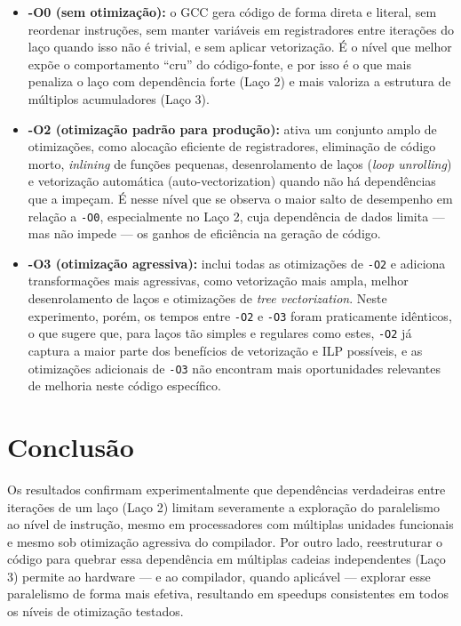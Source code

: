 \documentclass[a4paper,12pt]{article}
\begin{document}
\begin{itemize}
    \item \textbf{-O0 (sem otimização):} o GCC gera código de forma direta e literal, sem reordenar instruções, sem manter variáveis em registradores entre iterações do laço quando isso não é trivial, e sem aplicar vetorização. É o nível que melhor expõe o comportamento ``cru'' do código-fonte, e por isso é o que mais penaliza o laço com dependência forte (Laço 2) e mais valoriza a estrutura de múltiplos acumuladores (Laço 3).
    \item \textbf{-O2 (otimização padrão para produção):} ativa um conjunto amplo de otimizações, como alocação eficiente de registradores, eliminação de código morto, \textit{inlining} de funções pequenas, desenrolamento de laços (\textit{loop unrolling}) e vetorização automática (auto-vectorization) quando não há dependências que a impeçam. É nesse nível que se observa o maior salto de desempenho em relação a \texttt{-O0}, especialmente no Laço 2, cuja dependência de dados limita — mas não impede — os ganhos de eficiência na geração de código.
    \item \textbf{-O3 (otimização agressiva):} inclui todas as otimizações de \texttt{-O2} e adiciona transformações mais agressivas, como vetorização mais ampla, melhor desenrolamento de laços e otimizações de \textit{tree vectorization}. Neste experimento, porém, os tempos entre \texttt{-O2} e \texttt{-O3} foram praticamente idênticos, o que sugere que, para laços tão simples e regulares como estes, \texttt{-O2} já captura a maior parte dos benefícios de vetorização e ILP possíveis, e as otimizações adicionais de \texttt{-O3} não encontram mais oportunidades relevantes de melhoria neste código específico.
\end{itemize}

\section{Conclusão}

Os resultados confirmam experimentalmente que dependências verdadeiras entre iterações de um laço (Laço 2) limitam severamente a exploração do paralelismo ao nível de instrução, mesmo em processadores com múltiplas unidades funcionais e mesmo sob otimização agressiva do compilador. Por outro lado, reestruturar o código para quebrar essa dependência em múltiplas cadeias independentes (Laço 3) permite ao hardware — e ao compilador, quando aplicável — explorar esse paralelismo de forma mais efetiva, resultando em speedups consistentes em todos os níveis de otimização testados.
\end{document}
